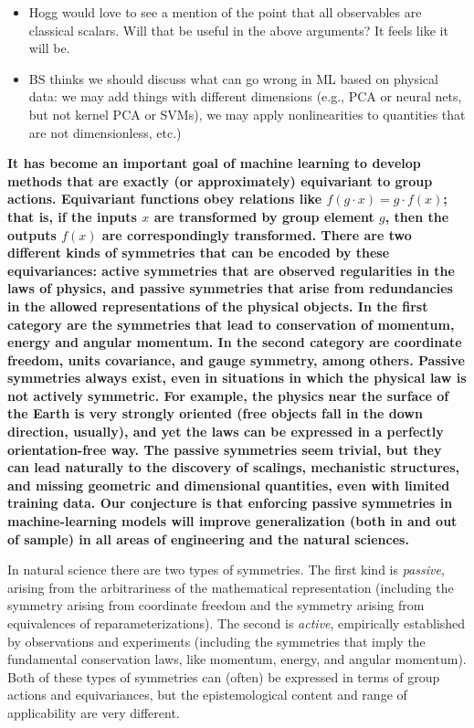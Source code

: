 \documentclass[11pt]{article}
\begin{document}
\begin{itemize}
  \item Hogg would love to see a mention of the point that all observables are classical scalars. Will that be useful in the above arguments? It feels like it will be.
  \item BS thinks we should discuss what can go wrong in ML based on physical data: we may add things with different dimensions (e.g., PCA or neural nets, but not kernel PCA or SVMs), we may apply nonlinearities to quantities that are not dimensionless, etc.)
\end{itemize}

{\bfseries\noindent
It has become an important goal of machine learning to develop methods that are exactly (or approximately) equivariant to group actions.
Equivariant functions obey relations like $f(g\cdot x) = g\cdot f(x)$; that is, if the inputs $x$ are transformed by group element $g$, then the outputs $f(x)$ are correspondingly transformed.
There are two different kinds of symmetries that can be encoded by these equivariances: active symmetries that are observed regularities in the laws of physics, and passive symmetries that arise from redundancies in the allowed representations of the physical objects. 
In the first category are the symmetries that lead to conservation of momentum, energy and angular momentum. In the second category are coordinate freedom, units covariance, and gauge symmetry, among others.  
Passive symmetries always exist, even in situations in which the physical law is not actively symmetric.
For example, the physics near the surface of the Earth is very strongly oriented (free objects fall in the down direction, usually), and yet the laws can be expressed in a perfectly orientation-free way.
The passive symmetries seem trivial, but they can lead naturally to the discovery of scalings, mechanistic structures, and missing geometric and dimensional quantities, even with limited training data.
Our conjecture is that enforcing passive symmetries in machine-learning models will improve generalization (both in and out of sample) in all areas of engineering and the natural sciences.}

\bigskip\noindent
In natural science there are two types of symmetries. 
The first kind is \emph{passive}, arising from the arbitrariness of the mathematical representation (including the symmetry arising from coordinate freedom and the symmetry arising from equivalences of reparameterizations).
The second is \emph{active}, empirically established by observations and experiments (including the symmetries that imply the fundamental conservation laws, like momentum, energy, and angular momentum). Both of these types of symmetries can (often) be expressed in terms of group actions and equivariances, but the epistemological content and range of applicability are very different. 
\end{document}
